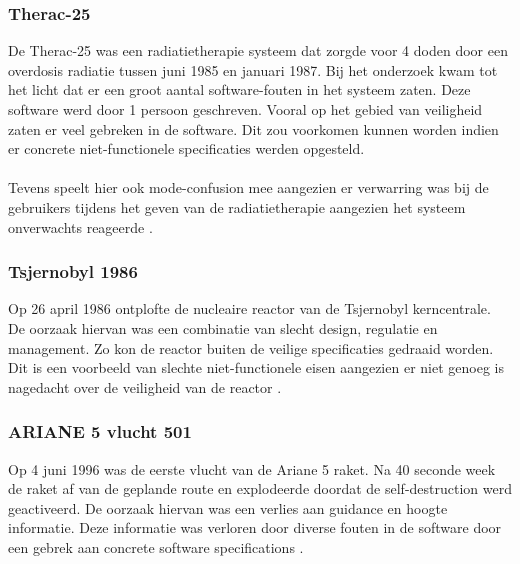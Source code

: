 \subsubsection*{Therac-25}
De Therac-25 was een radiatietherapie systeem dat zorgde voor 4 doden door een overdosis radiatie tussen juni 1985 en januari 1987. Bij het onderzoek kwam tot het licht dat er een groot aantal software-fouten in het systeem zaten. Deze software werd door 1 persoon geschreven. Vooral op het gebied van veiligheid zaten er veel gebreken in de software. Dit zou voorkomen kunnen worden indien er concrete niet-functionele specificaties werden opgesteld. \\\\
Tevens speelt hier ook mode-confusion mee aangezien er verwarring was bij de gebruikers tijdens het geven van de radiatietherapie aangezien het systeem onverwachts reageerde \cite{leveson1993investigation}.
\subsubsection*{Tsjernobyl 1986}
Op 26 april 1986 ontplofte de nucleaire reactor van de Tsjernobyl kerncentrale. De oorzaak hiervan was een combinatie van slecht design, regulatie en management. Zo kon de reactor buiten de veilige specificaties gedraaid worden. Dit is een voorbeeld van slechte niet-functionele eisen aangezien er niet genoeg is nagedacht over de veiligheid van de reactor \cite{shlyakhter1992chernobyl}. 
\subsubsection*{ARIANE 5 vlucht 501}
Op 4 juni 1996 was de eerste vlucht van de Ariane 5 raket. Na 40 seconde week de raket af van de geplande route en explodeerde doordat de self-destruction werd geactiveerd. De oorzaak hiervan was een verlies aan guidance en hoogte informatie. Deze informatie was verloren door diverse fouten in de software door een gebrek aan concrete software specifications \cite{lions1996ariane}.
